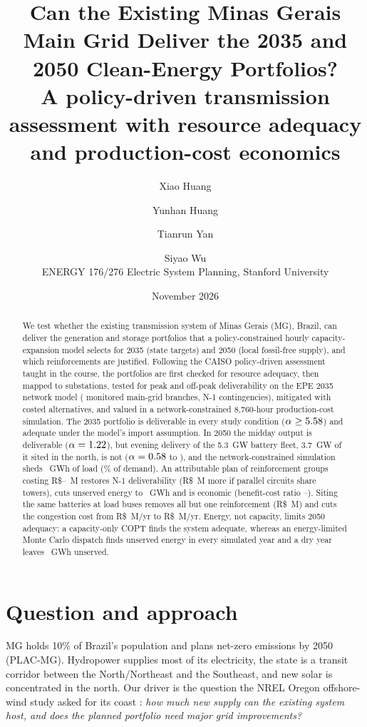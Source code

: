 \documentclass[10pt]{article}
\title{Can the Existing Minas Gerais Main Grid Deliver the 2035 and 2050 Clean-Energy Portfolios?\\[2pt]
\large A policy-driven transmission assessment with resource adequacy and production-cost economics}
\author{Xiao Huang \and Yunhan Huang \and Tianrun Yan \and Siyao Wu\\[2pt]
\small ENERGY 176/276 Electric System Planning, Stanford University}
\date{November 2026}
\newcommand{\RS}{R\$}
\begin{document}
\maketitle

\begin{abstract}
\noindent
We test whether the existing transmission system of Minas Gerais (MG), Brazil, can deliver the generation and storage portfolios that a
policy-constrained hourly capacity-expansion model selects for 2035 (state targets) and 2050 (local fossil-free supply), and which
reinforcements are justified. Following the CAISO policy-driven assessment taught in the course, the portfolios are first checked for
resource adequacy, then mapped to substations, tested for peak and off-peak deliverability on the EPE 2035 network model
(\Nmonitored{} monitored main-grid branches, \Nncont{} N-1 contingencies), mitigated with costed alternatives, and valued in a
network-constrained 8,760-hour production-cost simulation.
The 2035 portfolio is deliverable in every study condition ($\alpha\ge5.58$) and adequate under the model's import
assumption. In 2050 the midday output is deliverable ($\alpha=1.22$), but evening delivery of the 5.3~GW battery fleet,
3.7~GW of it sited in the north, is not ($\alpha=0.58$ to \NalphaBHSNcaiso), and the network-constrained simulation sheds
\Nensbexistinggrid~GWh of load (\Nenspctbexistinggrid\% of demand). An attributable plan of \NgroupsR{} reinforcement groups costing
\RS\NcapexexclR--\NcapexR{}~M restores N-1 deliverability (\RS\Npremcapex~M more if parallel circuits share towers), cuts unserved energy to \Nensbwithplan~GWh and is economic (benefit-cost ratio
\NbcrRfull--\NbcrRexcl). Siting the same batteries at load buses removes all but one reinforcement (\RS\NcapexL~M) and cuts the congestion
cost from \RS\Ncongbexistinggrid~M/yr to \RS\Ncongbbessatloadexistinggrid~M/yr. Energy, not capacity, limits 2050 adequacy:
a capacity-only COPT finds the system adequate, whereas an energy-limited Monte Carlo dispatch finds unserved energy in every simulated
year and a dry year leaves \NeueBdryname~GWh unserved.
\end{abstract}

\section{Question and approach}
MG holds 10\% of Brazil's population and plans net-zero emissions by 2050 (PLAC-MG). Hydropower supplies most of its electricity, the
state is a transit corridor between the North/Northeast and the Southeast, and new solar is concentrated in the north. Our driver is the
question the NREL Oregon offshore-wind study asked for its coast \citep{nrel2021oregon,course_l15}: \emph{how much new supply can the
existing system host, and does the planned portfolio need major grid improvements?}
\end{document}
